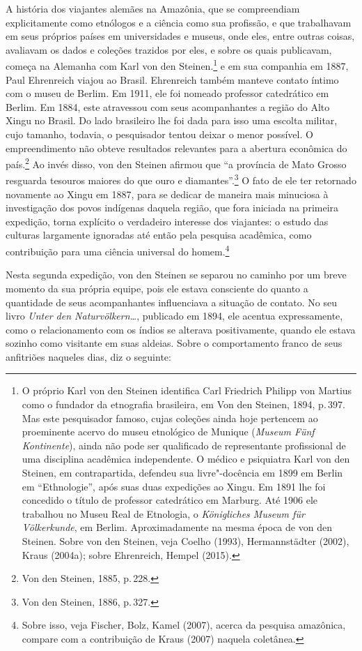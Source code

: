 A história dos viajantes alemães na Amazônia, que se compreendiam
explicitamente como etnólogos e a ciência como sua profissão, e que
trabalhavam em seus próprios países em universidades e museus, onde
eles, entre outras coisas, avaliavam os dados e coleções trazidos por
eles, e sobre os quais publicavam, começa na Alemanha com Karl von den
Steinen.\footnote{O próprio Karl von den Steinen identifica
  Carl Friedrich Philipp von Martius como o fundador da
  etnografia brasileira, em Von den Steinen, 1894, p.\,397. Mas este
  pesquisador famoso, cujas coleções ainda hoje pertencem ao proeminente
  acervo do museu etnológico de Munique (\textit{Museum Fünf Kontinente}),
  ainda não pode ser qualificado de representante profissional de uma
  disciplina acadêmica independente. O médico e psiquiatra Karl von den
  Steinen, em contrapartida, defendeu sua livre"-docência em 1899 em
  Berlin em ``Ethnologie'', após suas duas expedições ao Xingu. Em 1891
  lhe foi concedido o título de professor catedrático em Marburg. Até
  1906 ele trabalhou no Museu Real de Etnologia, o \textit{Königliches
  Museum für Völkerkunde}, em Berlim. Aproximadamente na mesma época de
  von den Steinen. Sobre von den Steinen, veja Coelho (1993), Hermannstädter
  (2002), Kraus (2004a); sobre Ehrenreich, Hempel (2015).} e em sua companhia em 1887, Paul Ehrenreich
 viajou ao Brasil. Ehrenreich também manteve contato íntimo
  com o museu de Berlim. Em 1911, ele foi nomeado professor catedrático
  em Berlim. Em 1884, este
atravessou com seus acompanhantes a região do Alto Xingu no Brasil. Do
lado brasileiro lhe foi dada para isso uma escolta militar, cujo
tamanho, todavia, o pesquisador tentou deixar o menor possível. O
empreendimento não obteve resultados relevantes para a abertura
econômica do país.\footnote{Von den Steinen, 1885, p.\,228.} Ao invés disso, von
den Steinen afirmou que ``a província de Mato Grosso resguarda tesouros
maiores do que ouro e diamantes''.\footnote{Von den Steinen, 1886, p.\,327.} O
fato de ele ter retornado novamente ao Xingu em 1887, para se dedicar de
maneira mais minuciosa à investigação dos povos indígenas daquela
região, que fora iniciada na primeira expedição, torna explícito o
verdadeiro interesse dos viajantes: o estudo das culturas largamente
ignoradas até então pela pesquisa acadêmica, como contribuição para uma
ciência universal do homem.\footnote{Sobre isso, veja Fischer, Bolz,
  Kamel (2007), acerca da pesquisa amazônica, compare com a
  contribuição de Kraus (2007) naquela coletânea.}

Nesta segunda expedição, von den Steinen se separou no caminho por um
breve momento da sua própria equipe, pois ele estava consciente do
quanto a quantidade de seus acompanhantes influenciava a situação de
contato. No seu livro \textit{Unter den Naturvölkern\ldots}, publicado em 1894, ele
acentua expressamente, como o relacionamento com os índios se alterava
positivamente, quando ele estava sozinho como visitante em suas aldeias.
Sobre o comportamento franco de seus anfitriões naqueles dias, diz o
seguinte: 

